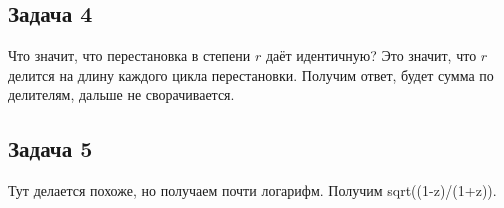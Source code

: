 \subsection{Задача 4}
	Что значит, что перестановка в степени $r$ даёт идентичную?
	Это значит, что $r$ делится на длину каждого цикла перестановки.
	Получим ответ, будет сумма по делителям, дальше не сворачивается.

\subsection{Задача 5}
	Тут делается похоже, но получаем почти логарифм.
	Получим sqrt((1-z)/(1+z)).
